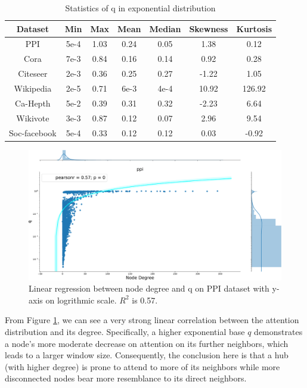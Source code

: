 \documentclass{article}
\begin{document}
\begin{table}
\caption{Statistics of q in exponential distribution}
\label{tab:analysis_q}
\centering
\begin{tabular}{ccccccc}
\toprule
Dataset & Min  & Max & Mean & Median & Skewness & Kurtosis \\
\midrule
PPI & 5e-4  & 1.03 & 0.24 & 0.05 & 1.38 & 0.12 \\
Cora & 7e-3  & 0.84 & 0.16 & 0.14 & 0.92 & 0.28 \\
Citeseer & 2e-3  & 0.36  & 0.25 & 0.27 & -1.22 & 1.05 \\
Wikipedia & 2e-5  & 0.71  & 6e-3 & 4e-4 & 10.92 & 126.92 \\
Ca-Hepth & 5e-2  & 0.39  & 0.31 & 0.32 & -2.23 & 6.64 \\
Wikivote & 3e-3  & 0.87  & 0.12 & 0.07 & 2.96 & 9.54\\
Soc-facebook & 5e-4  & 0.33 & 0.12 & 0.12 & 0.03 & -0.92 \\

\bottomrule
\end{tabular}
\end{table}

\begin{figure}
    \centering
    \includegraphics[width=\textwidth]{cs699/fig/degree_q.pdf}
    \caption{Linear regression between node degree and q on PPI dataset with y-axis on logrithmic scale. $R^2$ is 0.57.}
    \label{fig:degree_q}
\end{figure}


From Figure \ref{fig:degree_q}, we can see a very strong linear correlation between the attention distribution and its degree. Specifically, a higher exponential base $q$ demonstrates a node's more moderate decrease on attention on its further neighbors, which leads to a larger window size. Consequently, the conclusion here is that a hub (with higher degree) is prone to attend to more of its neighbors while more disconnected nodes bear more resemblance to its direct neighbors.
\end{document}
